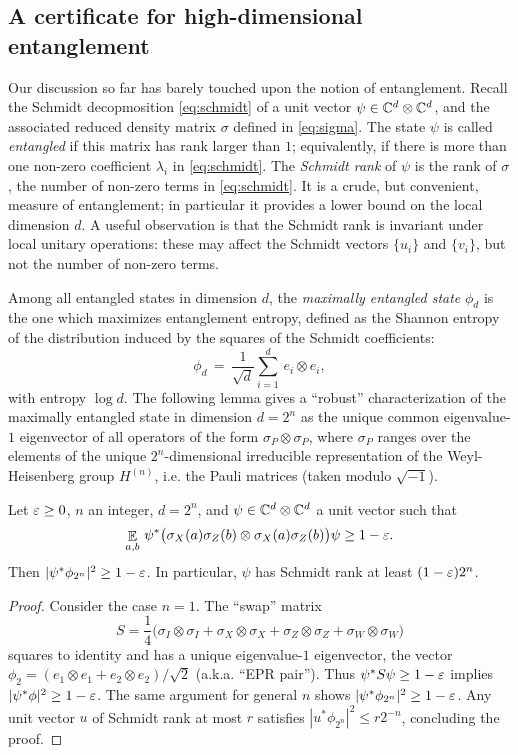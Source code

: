 \subsection{A certificate for high-dimensional entanglement}


Our discussion so far has barely touched upon the notion of entanglement. Recall the Schmidt decopmosition \eqref{eq:schmidt} of a unit vector $\psi \in \mathbb{C}^d\otimes \mathbb{C}^d$, and the associated reduced density matrix $\sigma$ defined in \eqref{eq:sigma}. The state $\psi$ is called \emph{entangled} if this matrix has rank larger than $1$; equivalently, if there is more than one non-zero coefficient $\lambda_i$ in \eqref{eq:schmidt}. The \emph{Schmidt rank} of $\psi$ is the rank of $\sigma$, the number of non-zero terms in \eqref{eq:schmidt}. It is a crude, but convenient, measure of entanglement; in particular it provides a lower bound on the local dimension $d$. A useful observation is that the Schmidt rank is invariant under local unitary operations: these may affect the Schmidt vectors $\{u_i\}$ and $\{v_i\}$, but not the number of non-zero terms. 



Among all entangled states in dimension $d$, the \emph{maximally entangled state} $\phi_d$ is the one which maximizes entanglement entropy, defined as the Shannon entropy of the distribution induced by the squares of the Schmidt coefficients: 
$$ \phi_d \,=\, \frac{1}{\sqrt{d}} \sum_{i=1}^d\, e_i\otimes e_i,$$
with entropy $\log d$. 
The following lemma gives a ``robust'' characterization of the maximally entangled state in dimension $d=2^n$ as the unique common eigenvalue-$1$ eigenvector of all operators of the form $\sigma_P \otimes \sigma_P$, where $\sigma_P$ ranges over the elements of the unique $2^n$-dimensional irreducible representation of the Weyl-Heisenberg group $H^{(n)}$, i.e. the Pauli matrices (taken modulo $\sqrt{-1}$).

\begin{lemma}\label{lem:sr}
Let $\varepsilon\geq 0$, $n$ an integer, $d=2^n$, and $\psi\in \mathbb{C}^d \otimes \mathbb{C}^d$ a unit vector  such that 
\begin{equation}\label{eq:lem-ass}
 \mathop{\mathbb{E}}\displaylimits_{a,b}\, \psi^* \big(\sigma_X(a) \sigma_Z(b)\otimes \sigma_X(a) \sigma_Z(b) \big) \psi \geq 1-\varepsilon.
\end{equation}
Then $|\psi^*\phi_{2^n}|^2 \geq 1-\varepsilon$. In particular, $\psi$ has Schmidt rank at least $(1-\varepsilon) 2^n$. 
\end{lemma}

\begin{proof}
Consider the case $n=1$. The ``swap'' matrix 
$$S = \frac{1}{4}\big(\sigma_I \otimes \sigma_I + \sigma_X \otimes \sigma_X + \sigma_Z \otimes \sigma_Z + \sigma_W \otimes \sigma_W\big)$$
squares to identity and has a unique eigenvalue-$1$ eigenvector, the vector $\phi_2 = (e_1\otimes e_1 + e_2\otimes e_2)/\sqrt{2}$ (a.k.a. ``EPR pair''). Thus $\psi^* S \psi \geq 1-\varepsilon$ implies $|\psi^* \phi|^2 \geq 1-\varepsilon$. The same argument for general $n$ shows $|\psi^* \phi_{2^n}|^2 \geq 1-\varepsilon$. Any unit vector $u$ of Schmidt rank at most $r$ satisfies $|u^* \phi_{2^n}|^2 \leq r2^{-n}$, concluding the proof. 
\end{proof}


